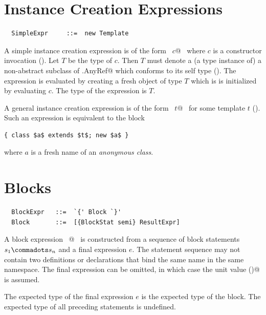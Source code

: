 \section{Instance Creation Expressions}
\label{sec:inst-creation}

\syntax\begin{lstlisting}
  SimpleExpr     ::=  new Template
\end{lstlisting}

A simple instance creation expression is of the form ~\lstinline@new $c$@~ 
where $c$ is a constructor invocation
().  Let $T$ be the type of $c$. Then $T$ must
denote a (a type instance of) a non-abstract subclass of
\lstinline@scala.AnyRef@ which conforms to its self type
(). The expression is evaluated by creating a fresh
object of type $T$ which is is initialized by evaluating $c$. The
type of the expression is $T$.

A general instance creation expression is of the form 
~\lstinline@new $t$@~ for some template $t$ ().
Such an expression is equivalent to the block
\begin{lstlisting}
{ class $a$ extends $t$; new $a$ }
\end{lstlisting}
where $a$ is a fresh name of an {\em anonymous class}.

\section{Blocks}
\label{sec:blocks}

\syntax\begin{lstlisting}
  BlockExpr   ::=  `{' Block `}'
  Block       ::=  [{BlockStat semi} ResultExpr]
\end{lstlisting}

A block expression ~@~ is
constructed from a sequence of block statements $s_1 \commadots s_n$
and a final expression $e$.  The statement sequence may not contain
two definitions or declarations that bind the same name in the same
namespace.  The final expression can be omitted, in which
case the unit value \lstinline@()@ is assumed.


The expected type of the final expression $e$ is the expected
type of the block. The expected type of all preceding statements is
undefined.

